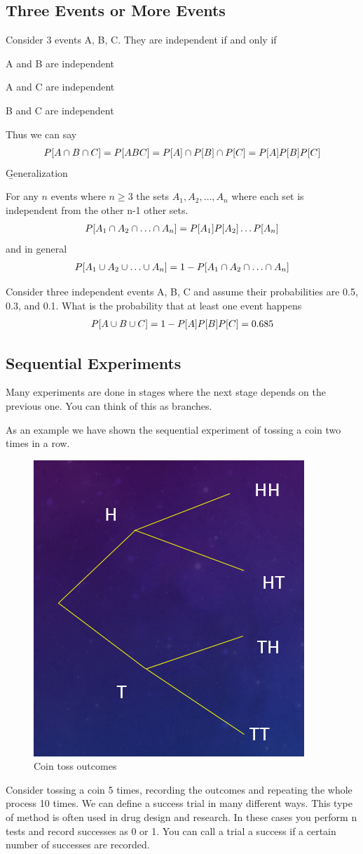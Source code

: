 \documentclass[12pt, titlepage, oneside]{article}
\begin{document}
\subsection{Three Events or More Events}
Consider 3 events A, B, C. They are independent if and only if
\items
\item A and B are independent
\item A and C are independent 
\item B and C are independent
\eitems

Thus we can say
\begin{align}
P[A \cap B \cap C] = P[ABC] = P[A]\cap P[B]\cap P[C] = P[A]P[B]P[C]
\end{align}
\b{Generalization}

For any $n$ events where $n \geq 3$ the sets $A_1,A_2,\dots,A_n$ where each set is independent from the other n-1 other sets.
\begin{align}
P[A_1 \n A_2 \n \dots \n A_n] = P[A_1]P[A_2]\dots P[A_n]
\end{align}
and in general
\begin{align}
P[A_1\u A_2 \u \dots \u A_n] = 1-P[A_1\n A_2 \n \dots \n A_n]
\end{align}

\ex Consider three independent events A, B, C and assume their probabilities are 0.5, 0.3, and 0.1. What is the probability that at least one event happens
\begin{align}
P[A\cup B \cup C] = 1- P[A]P[B]P[C] = 0.685
\end{align}
\subsection{Sequential Experiments}
Many experiments are done in stages where the next stage depends on the previous one. You can think of this as branches. 

As an example we have shown the sequential experiment of tossing a coin two times in a row.
\begin{figure}[h]
	\centering
	\includegraphics[width=0.5\linewidth]{images/toss}
	\caption{Coin toss outcomes}
	\label{fig:toss}
\end{figure}

Consider tossing a coin 5 times, recording the outcomes and repeating the whole process 10 times. We can define a success trial in many different ways. This type of method is often used in drug design and research. In these cases you perform n tests and record successes as 0 or 1. You can call a trial a success if a certain number of successes are recorded.
\end{document}
